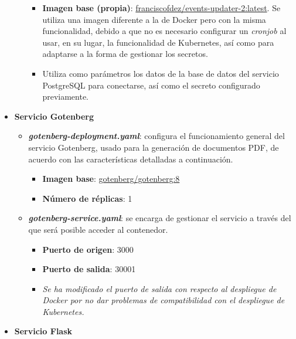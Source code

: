 \documentclass{report}
\begin{document}
\begin{itemize}
\begin{itemize}
                    \begin{itemize}
                        \item \textbf{Imagen base (propia)}: \href{https://hub.docker.com/r/franciscofdez/events-updater-2}{franciscofdez/events-updater-2:latest}. Se utiliza una imagen diferente a la de Docker pero con la misma funcionalidad, debido a que no es necesario configurar un \textit{cronjob} al usar, en su lugar, la funcionalidad de Kubernetes, así como para adaptarse a la forma de gestionar los secretos.
                        \item Utiliza como parámetros los datos de la base de datos del servicio PostgreSQL para conectarse, así como el secreto configurado previamente.
                    \end{itemize}
                \end{itemize}
                \item \textbf{Servicio Gotenberg}
                \begin{itemize}
                    \item \textit{\textbf{gotenberg-deployment.yaml}}: configura el funcionamiento general del servicio Gotenberg, usado para la generación de documentos PDF, de acuerdo con las características detalladas a continuación.
                    \begin{itemize}
                        \item \textbf{Imagen base}: \href{https://hub.docker.com/r/gotenberg/gotenberg/}{gotenberg/gotenberg:8}
                        \item \textbf{Número de réplicas}: 1
                    \end{itemize}
                    \item \textit{\textbf{gotenberg-service.yaml}}: se encarga de gestionar el servicio a través del que será posible acceder al contenedor.
                    \begin{itemize}
                        \item \textbf{Puerto de origen}: 3000
                        \item \textbf{Puerto de salida}: 30001
                        \item \textit{Se ha modificado el puerto de salida con respecto al despliegue de Docker por no dar problemas de compatibilidad con el despliegue de Kubernetes.}
                    \end{itemize}
                \end{itemize}
                \item \textbf{Servicio Flask}

\end{itemize}
\end{document}
